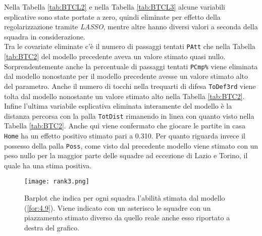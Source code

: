 Nella Tabella \ref{tab:BTCL2} e nella Tabella \ref{tab:BTCL3} alcune variabili esplicative sono state portate a zero, quindi eliminate per effetto della regolarizzazione tramite \emph{LASSO}, mentre altre hanno diversi valori a seconda della squadra in considerazione. \\
Tra le covariate eliminate c'è il numero di passaggi tentati \texttt{PAtt} che nella Tabella \ref{tab:BTC2} del modello precedente aveva un valore stimato quasi nullo. Sorprendentemente anche la percentuale di passaggi tentati \texttt{PCmp\%} viene eliminata dal modello nonostante per il modello precedente avesse un valore stimato alto del parametro. Anche il numero di tocchi nella trequarti di difesa \texttt{ToDef3rd} viene tolta dal modello nonostante un valore stimato alto nella Tabella \ref{tab:BTC2}. Infine l'ultima variabile esplicativa eliminata interamente del modello è la distanza percorsa con la palla \texttt{TotDist} rimanendo in linea con quanto visto nella Tabella \ref{tab:BTC2}.
Anche qui viene confermato che giocare le partite in casa \texttt{Home} ha un effetto positivo stimato pari a 0.310. Per quanto riguarda invece il possesso della palla \texttt{Poss}, come visto dal precedente modello viene stimato con un peso nullo per la maggior parte delle squadre ad eccezione di Lazio e Torino, il quale ha una stima positiva.

\begin{sidewaysfigure} 
	\centering
	\begin{center}
		\texttt{[image: rank3.png]}
		\caption{Barplot che indica per ogni squadra l'abilità stimata dal modello (\ref{for:4.9}). Viene indicato con un asterisco le squadre con un piazzamento stimato diverso da quello reale anche esso riportato a destra del grafico.} \label{tab:BTCL} 
	\end{center}
\end{sidewaysfigure}

